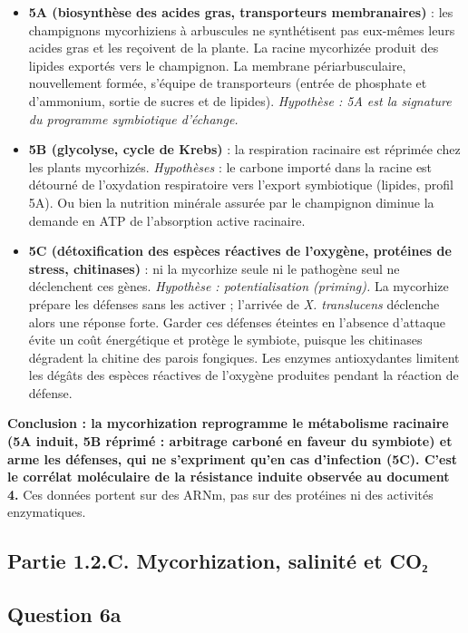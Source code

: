 \documentclass[11pt,a4paper]{article}
\providecommand{\tightlist}{\setlength{\itemsep}{0pt}\setlength{\parskip}{0pt}}
\begin{document}
\begin{itemize}
\tightlist
\item
  \textbf{5A (biosynthèse des acides gras, transporteurs membranaires)} : les champignons mycorhiziens à arbuscules ne synthétisent pas eux-mêmes leurs acides gras et les reçoivent de la plante. La racine mycorhizée produit des lipides exportés vers le champignon. La membrane périarbusculaire, nouvellement formée, s'équipe de transporteurs (entrée de phosphate et d'ammonium, sortie de sucres et de lipides). \emph{Hypothèse : 5A est la signature du programme symbiotique d'échange.}
\item
  \textbf{5B (glycolyse, cycle de Krebs)} : la respiration racinaire est réprimée chez les plants mycorhizés. \emph{Hypothèses} : le carbone importé dans la racine est détourné de l'oxydation respiratoire vers l'export symbiotique (lipides, profil 5A). Ou bien la nutrition minérale assurée par le champignon diminue la demande en ATP de l'absorption active racinaire.
\item
  \textbf{5C (détoxification des espèces réactives de l'oxygène, protéines de stress, chitinases)} : ni la mycorhize seule ni le pathogène seul ne déclenchent ces gènes. \emph{Hypothèse : potentialisation (priming).} La mycorhize prépare les défenses sans les activer ; l'arrivée de \emph{X. translucens} déclenche alors une réponse forte. Garder ces défenses éteintes en l'absence d'attaque évite un coût énergétique et protège le symbiote, puisque les chitinases dégradent la chitine des parois fongiques. Les enzymes antioxydantes limitent les dégâts des espèces réactives de l'oxygène produites pendant la réaction de défense.
\end{itemize}

\textbf{Conclusion : la mycorhization reprogramme le métabolisme racinaire (5A induit, 5B réprimé : arbitrage carboné en faveur du symbiote) et arme les défenses, qui ne s'expriment qu'en cas d'infection (5C). C'est le corrélat moléculaire de la résistance induite observée au document 4.} Ces données portent sur des ARNm, pas sur des protéines ni des activités enzymatiques.

\hypertarget{partie-1.2.c.-mycorhization-salinituxe9-et-coux2082}{%
\subsection{Partie 1.2.C. Mycorhization, salinité et CO₂}\label{partie-1.2.c.-mycorhization-salinituxe9-et-coux2082}}

\hypertarget{question-6a}{%
\subsection{Question 6a}\label{question-6a}}
\end{document}
